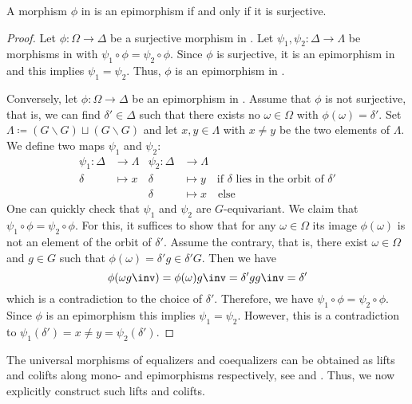 \begin{prop}[Epimorphisms]
A morphism $\phi$ in \Gset{} is an epimorphism if and only if it is surjective.
\end{prop} 
\begin{proof}
Let $\phi\colon \Omega \to \Delta$ be a surjective morphism in \Gset{}. Let $\psi_1,\psi_2\colon \Delta \to \Lambda$ be morphisms in \Gset{} with $\psi_1 \circ \phi = \psi_2 \circ \phi$. Since $\phi$ is surjective, it is an epimorphism in \Set{} and this implies $\psi_1 = \psi_2$. Thus, $\phi$ is an epimorphism in \Gset{}.

Conversely, let $\phi\colon \Omega \to \Delta$ be an epimorphism in \Gset{}. Assume that $\phi$ is not surjective, that is, we can find $\delta' \in \Delta$ such that there exists no $\omega \in \Omega$ with $\phi(\omega) = \delta'$. Set $\Lambda \coloneqq (G \backslash G) \sqcup (G \backslash G)$ and let $x,y \in \Lambda$ with $x \neq y$ be the two elements of $\Lambda$. We define two maps $\psi_1$ and $\psi_2$:
\begin{align*}
\psi_1\colon \Delta &\to \Lambda & \psi_2\colon \Delta &\to \Lambda\\
\delta &\mapsto x & \delta &\mapsto y\quad\text{if $\delta$ lies in the orbit of $\delta'$}\\
& & \delta &\mapsto x\quad\text{else}
\end{align*}
One can quickly check that $\psi_1$ and $\psi_2$ are $G$-equivariant. We claim that $\psi_1 \circ \phi = \psi_2 \circ \phi$. For this, it suffices to show that for any $\omega \in \Omega$ its image $\phi(\omega)$ is not an element of the orbit of $\delta'$. Assume the contrary, that is, there exist $\omega \in \Omega$ and $g \in G$ such that $\phi(\omega) = \delta' g \in \delta' G$. Then we have \[\phi(\omega g \inv) = \phi(\omega) g\inv = \delta' g g\inv = \delta'\] which is a contradiction to the choice of $\delta'$. Therefore, we have $\psi_1 \circ \phi = \psi_2 \circ \phi$. Since $\phi$ is an epimorphism this implies $\psi_1 = \psi_2$. However, this is a contradiction to $\psi_1(\delta') = x \neq y = \psi_2(\delta')$.
\end{proof}

The universal morphisms of equalizers and coequalizers can be obtained as lifts and colifts along mono- and epimorphisms respectively, see  and . Thus, we now explicitly construct such lifts and colifts.

